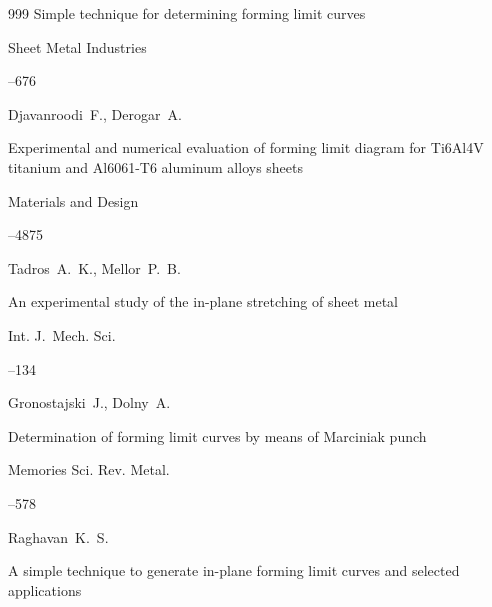 \begin{thebibliography}{999}
\paper Simple technique for determining forming limit curves

\jour  Sheet Metal Industries




–676




\by Djavanroodi~F., Derogar~A.  

\paper Experimental and numerical evaluation of forming limit diagram for Ti6Al4V titanium and Al6061-T6 aluminum alloys sheets

\jour Materials and Design




–4875






\by Tadros~A.~K., Mellor~P.~B.  

\paper An experimental study of the in-plane stretching of sheet metal

\jour Int. J.~Mech. Sci.




–134








\by Gronostajski~J., Dolny~A.  

\paper Determination of forming limit curves by means of Marciniak punch

\jour Memories Sci. Rev. Metal.



–578




\by Raghavan~K.~S.  

\paper A simple technique to generate in-plane forming limit curves and selected applications


\end{thebibliography}
